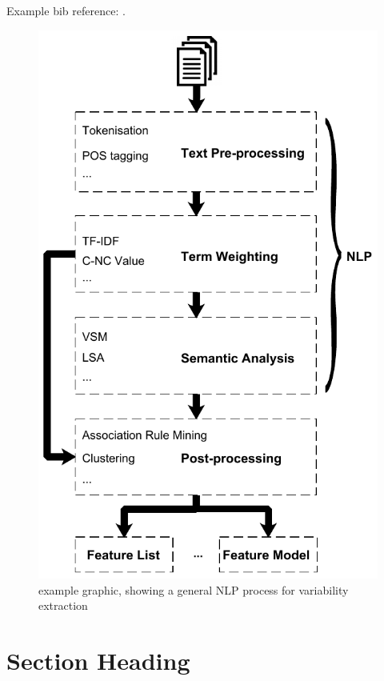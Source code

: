 \documentclass[graybox]{svmult}
\begin{document}
Example bib reference: \cite{VidyaSagarA14}. \\

\begin{figure}
\includegraphics{fig_nlp}
\caption{example graphic, showing a general NLP process for variability extraction}
\label{fig:nlp-general}
\end{figure}

\section{Section Heading}
\label{sec:2}


 
\end{document}
